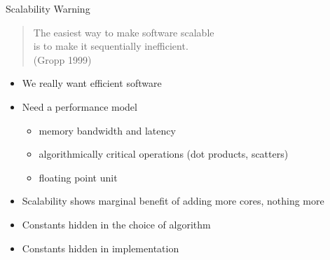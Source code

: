 \begin{frame}{Scalability Warning}
  \begin{quote}\Large \centering
    The easiest way to make software scalable \\
    is to make it sequentially inefficient. \\
    (Gropp 1999)
  \end{quote}

  \begin{itemize}
  \item We really want \alert{efficient} software
  \item Need a performance model
    \begin{itemize}
    \item memory bandwidth and latency
    \item algorithmically critical operations (\eg dot products, scatters)
    \item floating point unit
    \end{itemize}
  \item Scalability shows marginal benefit of adding more cores, nothing more
  \item Constants hidden in the choice of algorithm
  \item Constants hidden in implementation
  \end{itemize}
\end{frame}

